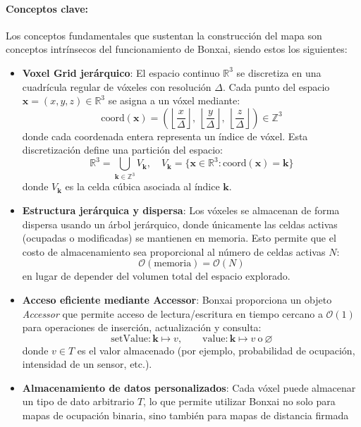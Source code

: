 \documentclass[12pt, a4paper, twoside]{article}
\begin{document}
\paragraph{Conceptos clave:}
Los conceptos fundamentales que sustentan la construcción del mapa son conceptos intrínsecos del funcionamiento de Bonxai\cite{faconti2024bonxai}, siendo estos los siguientes:
\begin{itemize}
  \item \textbf{Voxel Grid jerárquico}:  
  El espacio continuo \(\mathbb{R}^{3}\) se discretiza en una cuadrícula regular de vóxeles con resolución \(\Delta\).  
  Cada punto del espacio \(\mathbf{x} = (x,y,z) \in \mathbb{R}^{3}\) se asigna a un vóxel mediante:
  \[
  \mathrm{coord}(\mathbf{x}) = \left( 
  \left\lfloor \frac{x}{\Delta} \right\rfloor,\ 
  \left\lfloor \frac{y}{\Delta} \right\rfloor,\ 
  \left\lfloor \frac{z}{\Delta} \right\rfloor
  \right) \in \mathbb{Z}^{3}
  \]
  donde cada coordenada entera representa un índice de vóxel.  
  Esta discretización define una partición del espacio:
  \[
  \mathbb{R}^{3} = \bigcup_{\mathbf{k} \in \mathbb{Z}^{3}} V_{\mathbf{k}}, \quad
  V_{\mathbf{k}} = \{\mathbf{x} \in \mathbb{R}^{3} : \mathrm{coord}(\mathbf{x}) = \mathbf{k}\}
  \]
  donde \(V_{\mathbf{k}}\) es la celda cúbica asociada al índice \(\mathbf{k}\).
  \item \textbf{Estructura jerárquica y dispersa}:  
  Los vóxeles se almacenan de forma dispersa usando un árbol jerárquico, donde únicamente las celdas activas (ocupadas o modificadas) se mantienen en memoria.  
  Esto permite que el costo de almacenamiento sea proporcional al número de celdas activas \(N\):
  \[
  \mathcal{O}(\text{memoria}) = \mathcal{O}(N)
  \]
  en lugar de depender del volumen total del espacio explorado.
  \item \textbf{Acceso eficiente mediante Accessor}:  
  Bonxai\cite{faconti2024bonxai} proporciona un objeto \textit{Accessor} que permite acceso de lectura/escritura en tiempo cercano a \(\mathcal{O}(1)\) para operaciones de inserción, actualización y 
  consulta:
  \[
  \text{setValue}: \mathbf{k} \mapsto v, \qquad
  \text{value}: \mathbf{k} \mapsto v \ \text{o} \ \varnothing
  \]
  donde \(v \in T\) es el valor almacenado (por ejemplo, probabilidad de ocupación, intensidad de un sensor, etc.).
  \item \textbf{Almacenamiento de datos personalizados}:  
  Cada vóxel puede almacenar un tipo de dato arbitrario \(T\), lo que permite utilizar Bonxai\cite{faconti2024bonxai} no solo para mapas de ocupación binaria, sino también para mapas de distancia firmada 

\end{itemize}
\end{document}
